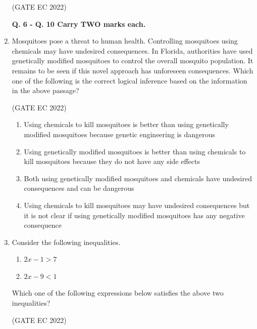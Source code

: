 \documentclass[journal,12pt,onecolumn]{IEEEtran}
\theoremstyle{remark}
\begin{document}
\begin{enumerate}
    \hfill{(GATE EC 2022)}
    \begin{enumerate}
    \end{enumerate}

    \textbf{Q. 6 - Q. 10  Carry TWO marks each.}

    \item Mosquitoes pose a threat to human health. Controlling mosquitoes using chemicals may have undesired consequences. In Florida, authorities have used genetically modified mosquitoes to control the overall mosquito population. It remains to be seen if this novel approach has unforeseen consequences.
    Which one of the following is the correct logical inference based on the information in the above passage?

    \hfill{(GATE EC 2022)}
    \begin{enumerate}
        \item Using chemicals to kill mosquitoes is better than using genetically modified mosquitoes because genetic engineering is dangerous
        \item Using genetically modified mosquitoes is better than using chemicals to kill mosquitoes because they do not have any side effects
        \item Both using genetically modified mosquitoes and chemicals have undesired consequences and can be dangerous
        \item Using chemicals to kill mosquitoes may have undesired consequences but it is not clear if using genetically modified mosquitoes has any negative consequence
    \end{enumerate}

    \item Consider the following inequalities.
    \begin{enumerate}
        \item $2x - 1 > 7$
        \item $2x - 9 < 1$
    \end{enumerate}
    Which one of the following expressions below satisfies the above two inequalities?

    \hfill{(GATE EC 2022)}
    \begin{enumerate}
    \end{enumerate}


\end{enumerate}
\end{document}
